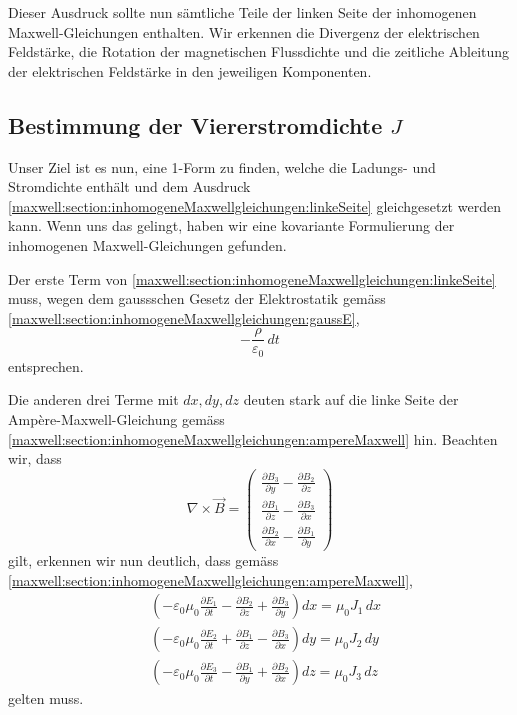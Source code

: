 Dieser Ausdruck sollte nun sämtliche Teile der linken Seite der inhomogenen Maxwell-Gleichungen enthalten.
Wir erkennen die Divergenz der elektrischen Feldstärke, die Rotation der magnetischen Flussdichte und die zeitliche Ableitung der elektrischen Feldstärke in den jeweiligen Komponenten.
\subsection{Bestimmung der Viererstromdichte $J$}

Unser Ziel ist es nun, eine 1-Form zu finden, welche die Ladungs- und Stromdichte enthält und dem Ausdruck \eqref{maxwell:section:inhomogeneMaxwellgleichungen:linkeSeite} gleichgesetzt werden kann.
Wenn uns das gelingt, haben wir eine kovariante Formulierung der inhomogenen Maxwell-Gleichungen gefunden.

Der erste Term von \eqref{maxwell:section:inhomogeneMaxwellgleichungen:linkeSeite} muss, wegen dem gaussschen Gesetz der Elektrostatik gemäss \eqref{maxwell:section:inhomogeneMaxwellgleichungen:gaussE}, 
\begin{equation*}
	-\frac{\rho}{\varepsilon_0} \,dt
\end{equation*}
entsprechen.

Die anderen drei Terme mit $dx,dy,dz$ deuten stark auf die linke Seite der Ampère-Maxwell-Gleichung gemäss \eqref{maxwell:section:inhomogeneMaxwellgleichungen:ampereMaxwell} hin.
Beachten wir, dass 
\begin{equation*}
	\nabla \times \vec{B} = 
	\begin{pmatrix}
		\frac{\partial B_3}{\partial y} - \frac{\partial B_2}{\partial z}\\[1ex]
		\frac{\partial B_1}{\partial z} - \frac{\partial B_3}{\partial x}\\[1ex]
		\frac{\partial B_2}{\partial x} - \frac{\partial B_1}{\partial y}
	\end{pmatrix}
\end{equation*}
gilt, erkennen wir nun deutlich, dass gemäss \eqref{maxwell:section:inhomogeneMaxwellgleichungen:ampereMaxwell},
\begin{align*}
	&\left(-\varepsilon_0\mu_0\frac{\partial E_1}{\partial t} - \frac{\partial B_2}{\partial z} + \frac{\partial B_3}{\partial y} \right) dx = \mu_0 J_1 \, dx\\
	&\left( -\varepsilon_0\mu_0\frac{\partial E_2}{\partial t} + \frac{\partial B_1}{\partial z} - \frac{\partial B_3}{\partial x} \right) dy = \mu_0 J_2 \, dy\\
	&\left( -\varepsilon_0\mu_0\frac{\partial E_3}{\partial t} - \frac{\partial B_1}{\partial y} + \frac{\partial B_2}{\partial x} \right) dz = \mu_0 J_3 \, dz
\end{align*}
gelten muss.

